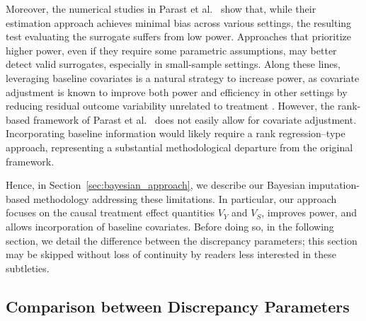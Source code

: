 \documentclass[12pt]{article}
\begin{document}
Moreover, the numerical studies in Parast et al.\ \citep{parast2024rank} show that, while their estimation approach achieves minimal bias across various settings, the resulting test evaluating the surrogate suffers from low power. Approaches that prioritize higher power, even if they require some parametric assumptions, may better detect valid surrogates, especially in small-sample settings. Along these lines, leveraging baseline covariates is a natural strategy to increase power, as covariate adjustment is known to improve both power and efficiency in other settings by reducing residual outcome variability unrelated to treatment \citep{zhang2008improving, colantuoni2015leveraging, zhang2019machine}. However, the rank-based framework of Parast et al.\ \citep{parast2024rank} does not easily allow for covariate adjustment. Incorporating baseline information would likely require a rank regression--type approach, representing a substantial methodological departure from the original framework.

Hence, in Section~\ref{sec:bayesian_approach}, we describe our Bayesian imputation-based methodology addressing these limitations. In particular, our approach focuses on the causal treatment effect quantities \(V_{Y}\) and \(V_{S}\), improves power, and allows incorporation of baseline covariates. Before doing so, in the following section, we detail the difference between the discrepancy parameters; this section may be skipped without loss of continuity by readers less interested in these subtleties.

\subsection{Comparison between Discrepancy Parameters}\label{subsec:comparison_parameters}
\end{document}
